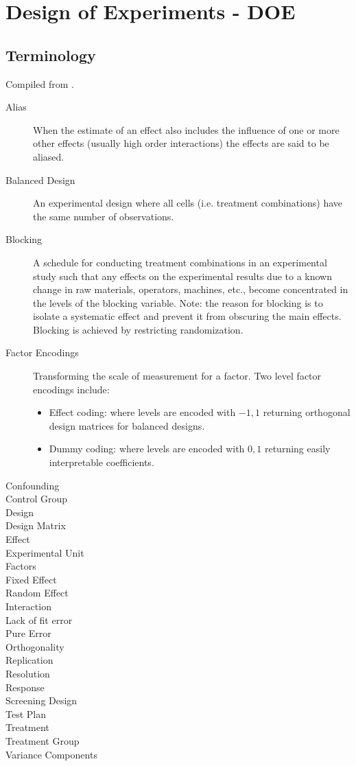 \chapter{Design of Experiments - DOE}

\section{Terminology}
Compiled from \cite{natrella_nist/sematech_2010}.
\begin{description}
\item [Alias] When the estimate of an effect also includes the influence of one or more other effects (usually high order interactions) the effects are said to be aliased.
\item [Balanced Design] An experimental design where all cells (i.e. treatment combinations) have the same number of observations.
\item [Blocking] A schedule for conducting treatment combinations in an experimental study such that any effects on the experimental results due to a known change in raw materials, operators, machines, etc., become concentrated in the levels of the blocking variable. Note: the reason for blocking is to isolate a systematic effect and prevent it from obscuring the main effects. Blocking is achieved by restricting randomization.
\item [Factor Encodings] Transforming the scale of measurement for a factor. 
Two level factor encodings include:
\begin{itemize}
\item Effect coding: where levels are encoded with $-1,1$ returning orthogonal design matrices for balanced designs.
\item Dummy coding: where levels are encoded with $0,1$ returning easily interpretable coefficients.
\end{itemize}

\item [Confounding]
\item [Control Group]
\item [Design]
\item [Design Matrix]
\item [Effect]
\item [Experimental Unit]
\item [Factors]
\item [Fixed Effect]
\item [Random Effect]
\item [Interaction]
\item [Lack of fit error]
\item [Pure Error]
\item [Orthogonality]
\item [Replication]
\item [Resolution]
\item [Response]
\item [Screening Design]
\item [Test Plan]
\item [Treatment]
\item [Treatment Group]
\item [Variance Components]
\end{description}

